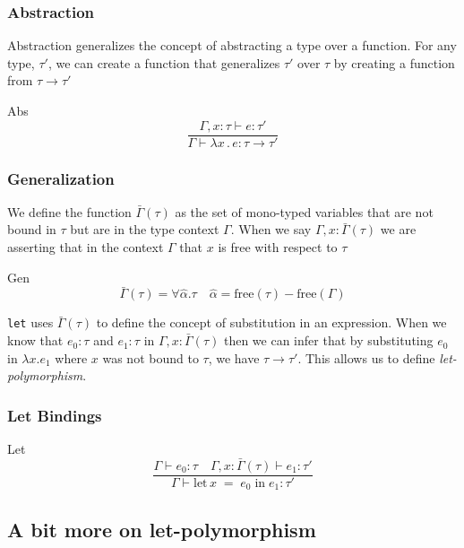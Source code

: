 \documentclass{beamer}
\begin{document}
\begin{frame}
  \frametitle{Abstraction}
  Abstraction generalizes the concept of abstracting a type over a
  function.  For any type, $\tau'$, we can create a function that
  generalizes $\tau'$ over $\tau$ by creating a function from
  $\tau \rightarrow \tau'$

  \begin{exampleblock}{Abs}
    \[
      \frac{\Gamma, x : \tau \vdash e : \tau'}
      {\Gamma \vdash \lambda x\, .\, e : \tau \rightarrow \tau'}
    \]
  \end{exampleblock}
\end{frame}

\begin{frame}
  \frametitle{Generalization}
  We define the function $\bar{\Gamma}(\tau)$ as the set of mono-typed
  variables that are not bound in $\tau$ but are in the type context
  $\Gamma$. When we say $\Gamma, x : \bar{\Gamma}(\tau)$ we are
  asserting that in the context $\Gamma$ that $x$ is free with respect
  to $\tau$
  \begin{exampleblock}{Gen}
    \[
      \bar{\Gamma}(\tau) = \forall \hat{\alpha} . \tau \quad \hat{\alpha} = \text{free}(\tau) - \text{free}(\Gamma)
    \]
  \end{exampleblock}
\end{frame}

\begin{frame}

  {\tt let} uses $\bar{\Gamma}(\tau)$ to define the concept of
  substitution in an expression.  When we know that $e_0 : \tau$ and
  $e_1 : \tau$ in $\Gamma, x:\bar{\Gamma}(\tau)$ then we can infer
  that by substituting $e_0$ in $\lambda x . e_1$ where $x$ was not
  bound to $\tau$, we have $\tau \rightarrow \tau'$.  This allows us
  to define \emph{let-polymorphism}.

  \frametitle{Let Bindings}
  \begin{exampleblock}{Let}
    \[
      \frac{\Gamma \vdash e_0 : \tau \quad \Gamma, x : \bar{\Gamma}(\tau) \vdash e_1 : \tau'}
      {\Gamma \vdash \text{let}\, x\; =\; e_0\; \text{in}\; e_1 : \tau'}
    \]
  \end{exampleblock}
\end{frame}

\subsection {A bit more on let-polymorphism}
\end{document}
